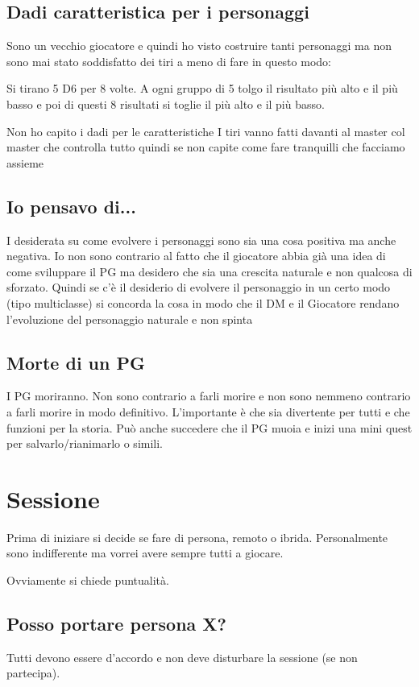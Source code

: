 \subsection{Dadi caratteristica per i personaggi}
Sono un vecchio giocatore e quindi ho visto costruire tanti personaggi ma non sono mai stato soddisfatto dei tiri a meno di fare in questo modo:

Si tirano 5 D6 per 8 volte. A ogni gruppo di 5 tolgo il risultato più alto e il più basso e poi di questi 8 risultati si toglie il più alto e il più basso.

\begin{DndComment}{Non ho capito i dadi per le caratteristiche}
I tiri vanno fatti davanti al master col master che controlla tutto quindi se non capite come fare tranquilli che facciamo assieme
\end{DndComment}

\subsection{Io pensavo di...}
I desiderata su come evolvere i personaggi sono sia una cosa positiva ma anche negativa.
Io non sono contrario al fatto che il giocatore abbia già una idea di come sviluppare il PG ma desidero che sia una crescita naturale e non qualcosa di sforzato. Quindi se c'è il desiderio di evolvere il personaggio in un certo modo (tipo multiclasse) si concorda la cosa in modo che il DM e il Giocatore rendano l'evoluzione del personaggio naturale e non spinta

\subsection{Morte di un PG}
I PG moriranno. Non sono contrario a farli morire e non sono nemmeno contrario a farli morire in modo definitivo. L'importante è che sia divertente per tutti e che funzioni per la storia. Può anche succedere che il PG muoia e inizi una mini quest per salvarlo/rianimarlo o simili.

\section{Sessione}
Prima di iniziare si decide se fare di persona, remoto o ibrida. 
Personalmente sono indifferente ma vorrei avere sempre tutti a giocare.

Ovviamente si chiede puntualità.

\subsection{Posso portare persona X?}
Tutti devono essere d'accordo e non deve disturbare la sessione (se non partecipa).

